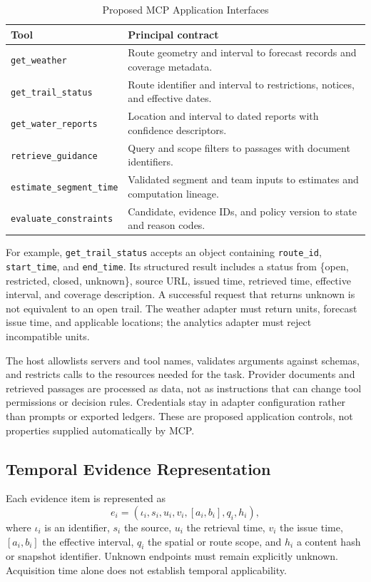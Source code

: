 \documentclass[conference]{IEEEtran}
\newcommand{\tool}[1]{\texttt{#1}}
\begin{document}
\begin{table}[t]
\caption{Proposed MCP Application Interfaces}
\label{tab:tools}
\centering\footnotesize
\begin{tabular}{@{}p{}p{}@{}}
\toprule
Tool & Principal contract\\
\midrule
\tool{get\_weather} & Route geometry and interval to forecast records and coverage metadata.\\
\tool{get\_trail\_status} & Route identifier and interval to restrictions, notices, and effective dates.\\
\tool{get\_water\_reports} & Location and interval to dated reports with confidence descriptors.\\
\tool{retrieve\_guidance} & Query and scope filters to passages with document identifiers.\\
\tool{estimate\_segment\_time} & Validated segment and team inputs to estimates and computation lineage.\\
\tool{evaluate\_constraints} & Candidate, evidence IDs, and policy version to state and reason codes.\\
\bottomrule
\end{tabular}
\end{table}

For example, \tool{get\_trail\_status} accepts an object containing \tool{route\_id}, \tool{start\_time}, and \tool{end\_time}. Its structured result includes a status from \{open, restricted, closed, unknown\}, source URL, issued time, retrieved time, effective interval, and coverage description. A successful request that returns unknown is not equivalent to an open trail. The weather adapter must return units, forecast issue time, and applicable locations; the analytics adapter must reject incompatible units.

The host allowlists servers and tool names, validates arguments against schemas, and restricts calls to the resources needed for the task. Provider documents and retrieved passages are processed as data, not as instructions that can change tool permissions or decision rules. Credentials stay in adapter configuration rather than prompts or exported ledgers. These are proposed application controls, not properties supplied automatically by MCP.

\subsection{Temporal Evidence Representation}
Each evidence item is represented as
\begin{equation}
 e_i=(\iota_i,s_i,u_i,v_i,[a_i,b_i],q_i,h_i),
\end{equation}
where $\iota_i$ is an identifier, $s_i$ the source, $u_i$ the retrieval time, $v_i$ the issue time, $[a_i,b_i]$ the effective interval, $q_i$ the spatial or route scope, and $h_i$ a content hash or snapshot identifier. Unknown endpoints must remain explicitly unknown. Acquisition time alone does not establish temporal applicability.
\end{document}
